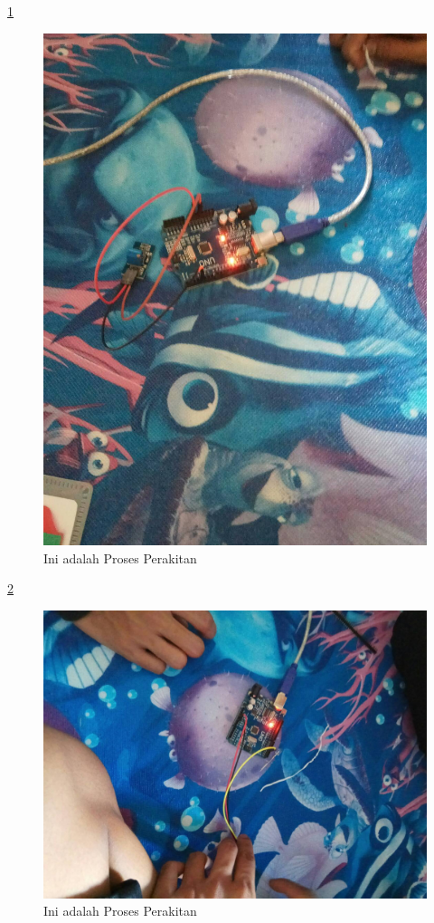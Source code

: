 \documentclass{article}
\begin{document}
  \ref{ar5}
  \begin{figure}[ht]
  \centerline{\includegraphics[width=1\textwidth]{../figures/ar5.jpg}}
  \caption{Ini adalah Proses Perakitan}
  \label{ar5}
  \end{figure}

  \ref{ar6}
  \begin{figure}[ht]
  \centerline{\includegraphics[width=1\textwidth]{../figures/ar6.jpg}}
  \caption{Ini adalah Proses Perakitan}
  \label{ar6}
  \end{figure}
\end{document}
